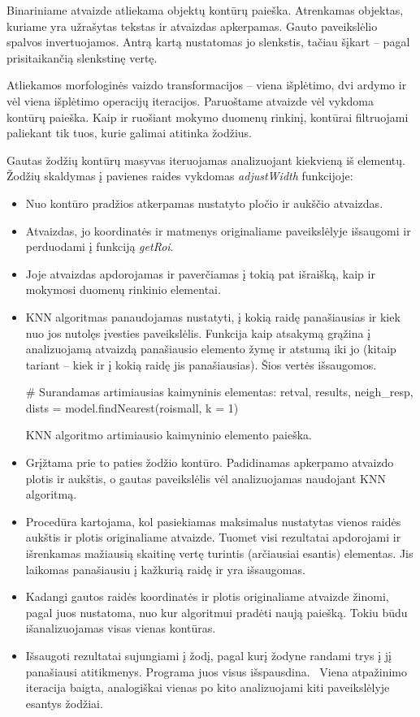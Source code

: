 \documentclass[a4paper,12pt]{article}
\begin{document}
Binariniame atvaizde atliekama objektų kontūrų paieška. Atrenkamas objektas, kuriame yra užrašytas tekstas ir atvaizdas apkerpamas. Gauto paveikslėlio spalvos invertuojamos. Antrą kartą nustatomas jo slenkstis, tačiau šįkart – pagal prisitaikančią slenkstinę vertę. 

Atliekamos morfologinės vaizdo transformacijos – viena išplėtimo, dvi ardymo ir vėl viena išplėtimo operacijų iteracijos. Paruoštame atvaizde vėl vykdoma kontūrų paieška. Kaip ir ruošiant mokymo duomenų rinkinį, kontūrai filtruojami paliekant tik tuos, kurie galimai atitinka žodžius. 

Gautas žodžių kontūrų masyvas iteruojamas analizuojant kiekvieną iš elementų. Žodžių skaldymas į pavienes raides vykdomas \textit{adjustWidth} funkcijoje:
\begin{itemize}
	\item Nuo kontūro pradžios atkerpamas nustatyto pločio ir aukščio atvaizdas.
	\item Atvaizdas, jo koordinatės ir matmenys originaliame paveikslėlyje išsaugomi ir perduodami į funkciją \textit{getRoi}.
	\item Joje atvaizdas apdorojamas ir paverčiamas į tokią pat išraišką, kaip ir mokymosi duomenų rinkinio elementai.
	\item KNN algoritmas panaudojamas nustatyti, į kokią raidę panašiausias ir kiek nuo jos nutolęs įvesties paveikslėlis. Funkcija kaip atsakymą grąžina į analizuojamą atvaizdą panašiausio elemento žymę ir atstumą iki jo (kitaip tariant – kiek ir į kokią raidę jis panašiausias). Šios vertės išsaugomos.
	 \begin{listing}[H]
	 	\begin{pythoncode}
# Surandamas artimiausias kaimyninis elementas:
retval, results, neigh_resp, dists = model.findNearest(roismall, k = 1)
	 	\end{pythoncode}
	 	\caption{KNN algoritmo artimiausio kaimyninio elemento paieška.}	
	 \end{listing}
	 \item Grįžtama prie to paties žodžio kontūro. Padidinamas apkerpamo atvaizdo plotis ir aukštis, o gautas paveikslėlis vėl analizuojamas naudojant KNN algoritmą.
	 \item Procedūra kartojama, kol pasiekiamas maksimalus nustatytas vienos raidės aukštis ir plotis originaliame atvaizde. Tuomet visi rezultatai apdorojami ir išrenkamas mažiausią skaitinę vertę turintis (arčiausiai esantis) elementas. Jis laikomas panašiausiu į kažkurią raidę ir yra išsaugomas.
	 \item Kadangi gautos raidės koordinatės ir plotis originaliame atvaizde žinomi, pagal juos nustatoma, nuo kur algoritmui pradėti naują paiešką. Tokiu būdu išanalizuojamas visas vienas kontūras.
	 \item Išsaugoti rezultatai sujungiami į žodį, pagal kurį žodyne randami trys į jį panašiausi atitikmenys. Programa juos visus išspausdina.
	 \ Viena atpažinimo iteracija baigta, analogiškai vienas po kito analizuojami kiti paveikslėlyje esantys žodžiai.
\end{itemize} 
 
\end{document}
